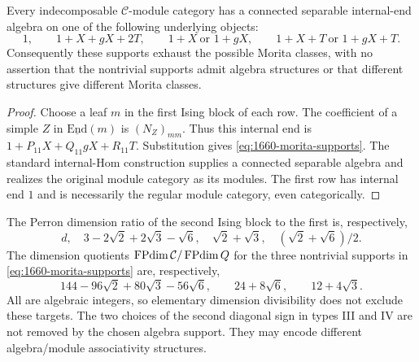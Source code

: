 \begin{corollary}
Every indecomposable $\mathcal C$-module category has a connected separable
internal-end algebra on one of the following underlying objects:
\begin{equation}
1,\qquad 1+X+gX+2T,\qquad 1+X\ \text{or }1+gX,
\qquad 1+X+T\ \text{or }1+gX+T. \label{eq:1660-morita-supports}
\end{equation}
Consequently these supports exhaust the possible Morita classes, with
no assertion that the nontrivial supports admit algebra structures or
that different structures give different Morita classes.
\end{corollary}
\begin{proof}
Choose a leaf $m$ in the first Ising block of each row. The coefficient
of a simple $Z$ in $\underline{\mathrm{End}}(m)$ is $(N_Z)_{mm}$.
Thus this internal end is
$1+P_{11}X+Q_{11}gX+R_{11}T$. Substitution gives \eqref{eq:1660-morita-supports}.
The standard internal-Hom construction supplies a connected separable
algebra and realizes the original module category as its modules.
The first row has internal end $1$ and is necessarily the regular
module category, even categorically.
\end{proof}

The Perron dimension ratio of the second Ising block to the first is,
respectively,
\[
d,\quad 3-2\sqrt2+2\sqrt3-\sqrt6,\quad
\sqrt2+\sqrt3,\quad(\sqrt2+\sqrt6)/2.
\]
The dimension quotients $\operatorname{FPdim}\mathcal C/\operatorname{FPdim} Q$ for the three nontrivial
supports in \eqref{eq:1660-morita-supports} are, respectively,
\[
144-96\sqrt2+80\sqrt3-56\sqrt6,
\qquad24+8\sqrt6,\qquad12+4\sqrt3.
\]
All are algebraic integers, so elementary dimension divisibility does
not exclude these targets. The two choices of the second diagonal sign
in types III and IV are not removed by the chosen algebra support.
They may encode different algebra/module associativity structures.

